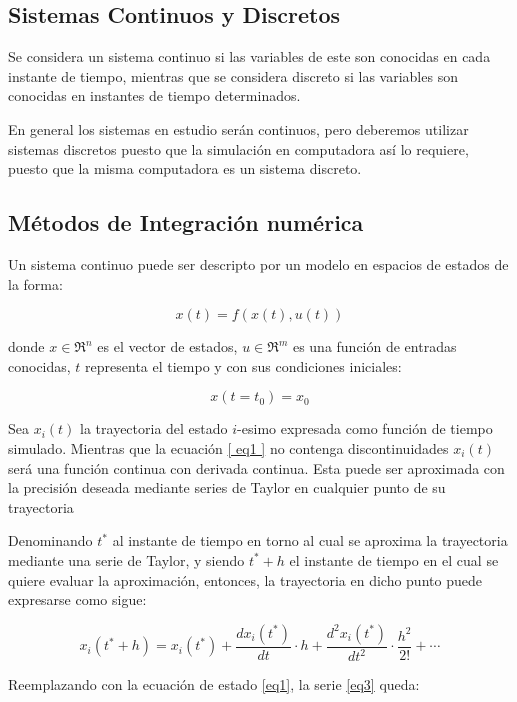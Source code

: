 \documentclass[a4paper,	11pt]{report}
\begin{document}
\subsection{Sistemas Continuos y Discretos}
Se considera un sistema continuo si las variables de este son conocidas en cada instante de tiempo, mientras que se considera discreto si las variables son conocidas en instantes de tiempo determinados.

En general los sistemas en estudio serán continuos, pero deberemos utilizar sistemas discretos puesto que la simulación en computadora así lo requiere, puesto que la misma computadora es un sistema discreto.

\subsection{Métodos de Integración numérica}
Un sistema continuo puede ser descripto por un modelo en espacios de estados de la forma:

\begin{equation} \label{eq1}
x(t) = f (x(t), u(t))
\end{equation}

donde $x \in \Re^n$  es el vector de estados, $u \in \Re^m$ es una función de entradas conocidas,
$t$ representa el tiempo y con sus condiciones iniciales:

\begin{equation} \label{eq2}
x(t = t_0 ) = x_0
\end{equation}

Sea $x_i (t)$ la trayectoria del estado $i$-esimo expresada como función de tiempo simulado. 
Mientras que la ecuación \eqref{ eq1 } no contenga discontinuidades $x_i (t)$ será una función continua con derivada continua. Esta puede ser aproximada con la precisión deseada mediante series de Taylor en cualquier punto de su trayectoria

Denominando $t^{\ast}$ al instante de tiempo en torno al cual se aproxima la trayectoria mediante una serie de Taylor, y siendo $t^{\ast} + h$ el instante de tiempo en el cual se quiere evaluar la aproximación, entonces, la trayectoria en dicho punto puede expresarse como sigue:

\begin{equation} \label{eq3}
x_i(t^* + h) = x_i(t^*) + \frac{dx_i (t^*)}{dt} \cdot h + \frac{d^{2}x_i (t^*)}{dt^2} \cdot \frac{h^2}{2!} + \cdots
\end{equation}

Reemplazando con la ecuación de estado \eqref{eq1}, la serie \eqref{eq3} queda:
\end{document}
